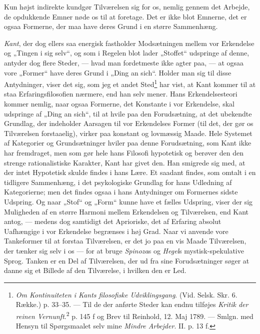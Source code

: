 \documentclass[12pt,a4paper]{book}
\newcommand{\apage}[1]{\marginnote{\footnotesize\textit{[#1]}}}
\begin{document}
Kun højst indirekte kundgør Tilværelsen sig for os, nemlig gennem det Arbejde, de
opdukkende Emner nøde os til at foretage. Det er ikke blot Emnerne, det er ogsaa
Formerne, der maa have deres Grund i en større Sammenhæng.

\emph{Kant}, der dog ellers saa energisk fastholder Modsætningen mellem vor
Erkendelse og „Tingen i sig selv“, og som i Regelen blot lader „Stoffet“ udspringe
af denne, antyder \apage{263} dog flere Steder, --- hvad man fordetmeste ikke agter paa, --- at
ogsaa vore „Former“ have deres Grund i „Ding an sich“. Holder man sig til disse
Antydninger, viser det sig, som jeg et andet Sted\footnote{\emph{Om Kontinuiteten i
Kants filosofiske Udviklingsgang}. (Vid. Selsk. Skr. 6. Række.) p. 33--35. --- Til
de der anførte Steder kan endnu tilføjes \emph{Kritik der reinen
Vernunft}.\textsuperscript{2} p. 145 f og Brev til Reinhold, 12. Maj 1789. ---
Smlgn. med Hensyn til Spørgsmaalet selv mine \emph{Mindre Arbejder}. II. p. 13 f.}
har vist, at Kant kommer til at staa Erfaringsfilosofien nærmere, end han selv
mener. Hans Erkendelsesteori kommer nemlig, naar ogsaa Formerne, det Konstante i
vor Erkendelse, skal udspringe af „Ding an sich“, til at hvile paa den
Forudsætning, at det ubekendte Grundlag, der indeholder Aarsagen til vor
Erkendelses Former (til det, der gør os Tilværelsen forstaaelig), virker paa
konstant og lovmæssig Maade. Hele Systemet af Kategorier og Grundsætninger hviler
paa denne Forudsætning, som Kant ikke har fremdraget, men som gør hele hans Filosofi
hypotetisk og berøver den den strenge rationalistiske Karakter, Kant har givet den.
Han smigrede sig med, at der intet Hypotetisk skulde findes i hans Lære. Et saadant
findes, som omtalt i en tidligere Sammenhæng, i det psykologiske Grundlag for hans
Udledning af Kategorierne; men det findes ogsaa i hans Antydninger om Formernes
sidste Udspring. Og naar „Stof“ og „Form“ kunne have et fælles Udspring, viser der
sig Muligheden af en større Harmoni mellem Erkendelsen og Tilværelsen, end Kant
antog, --- medens dog samtidigt det Aprioriske, det af Erfaring absolut Uafhængige
i vor Erkendelse begrænses i høj Grad. Naar vi anvende vore Tankeformer til at
forstaa Tilværelsen, er det jo paa en vis Maade Tilværelsen, der tænker sig selv i
os --- for at bruge \emph{Spinoza}s og \emph{Hegel}s mystisk-spekulative Sprog.
Tanken er en Del af Tilværelsen, der ud fra sine Forudsætninger søger at danne sig
et Billede af den Tilværelse, i hvilken den er Led.
\end{document}
